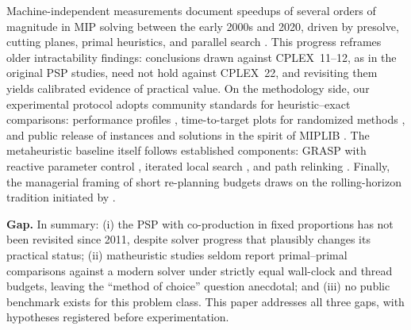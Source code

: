 Machine-independent measurements document speedups of several orders
of magnitude in MIP solving between the early 2000s and 2020, driven
by presolve, cutting planes, primal heuristics, and parallel search
\citep{koch2022progress,achterberg2013analyzing,achterberg2020presolve,bixby2012brief}.
This progress reframes older intractability findings: conclusions
drawn against CPLEX~11--12, as in the original PSP studies, need
not hold against CPLEX~22, and revisiting them yields calibrated
evidence of practical value. On the methodology side, our experimental
protocol adopts community standards for heuristic--exact comparisons:
performance profiles \citep{dolan2002benchmarking}, time-to-target
plots for randomized methods \citep{aiex2007ttt}, and public release
of instances and solutions in the spirit of MIPLIB
\citep{gleixner2021miplib}. The metaheuristic baseline itself follows
established components: GRASP \citep{feo1995greedy} with reactive
parameter control \citep{prais2000reactive}, iterated local search
\citep{lourenco2010iterated}, and path relinking
\citep{laguna1999grasp,resende2016optimization}. Finally, the
managerial framing of short re-planning budgets draws on the
rolling-horizon tradition initiated by \citet{baker1977experimental}.

\medskip
\noindent\textbf{Gap.} In summary: (i) the PSP with co-production in
fixed proportions has not been revisited since 2011, despite solver
progress that plausibly changes its practical status; (ii) matheuristic
studies seldom report primal--primal comparisons against a modern
solver under strictly equal wall-clock and thread budgets, leaving the
``method of choice'' question anecdotal; and (iii) no public benchmark
exists for this problem class. This paper addresses all three gaps,
with hypotheses registered before experimentation.
